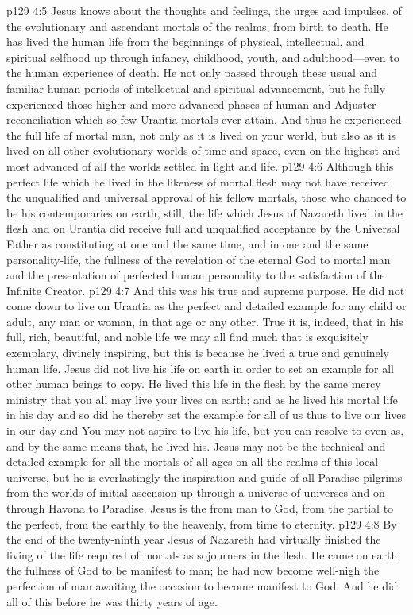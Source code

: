 \vs p129 4:5 Jesus knows about the thoughts and feelings, the urges and impulses, of the evolutionary and ascendant mortals of the realms, from birth to death. He has lived the human life from the beginnings of physical, intellectual, and spiritual selfhood up through infancy, childhood, youth, and adulthood---even to the human experience of death. He not only passed through these usual and familiar human periods of intellectual and spiritual advancement, but he  fully experienced those higher and more advanced phases of human and Adjuster reconciliation which so few Urantia mortals ever attain. And thus he experienced the full life of mortal man, not only as it is lived on your world, but also as it is lived on all other evolutionary worlds of time and space, even on the highest and most advanced of all the worlds settled in light and life.
\vs p129 4:6 Although this perfect life which he lived in the likeness of mortal flesh may not have received the unqualified and universal approval of his fellow mortals, those who chanced to be his contemporaries on earth, still, the life which Jesus of Nazareth lived in the flesh and on Urantia did receive full and unqualified acceptance by the Universal Father as constituting at one and the same time, and in one and the same personality\hyp{}life, the fullness of the revelation of the eternal God to mortal man and the presentation of perfected human personality to the satisfaction of the Infinite Creator.
\vs p129 4:7 And this was his true and supreme purpose. He did not come down to live on Urantia as the perfect and detailed example for any child or adult, any man or woman, in that age or any other. True it is, indeed, that in his full, rich, beautiful, and noble life we may all find much that is exquisitely exemplary, divinely inspiring, but this is because he lived a true and genuinely human life. Jesus did not live his life on earth in order to set an example for all other human beings to copy. He lived this life in the flesh by the same mercy ministry that you all may live your lives on earth; and as he lived his mortal life in his day and  so did he thereby set the example for all of us thus to live our lives in our day and  You may not aspire to live his life, but you can resolve to  even as, and by the same means that, he lived his. Jesus may not be the technical and detailed example for all the mortals of all ages on all the realms of this local universe, but he is everlastingly the inspiration and guide of all Paradise pilgrims from the worlds of initial ascension up through a universe of universes and on through Havona to Paradise. Jesus is the  from man to God, from the partial to the perfect, from the earthly to the heavenly, from time to eternity.\plusone
\pc \vs p129 4:8 By the end of the twenty\hyp{}ninth year Jesus of Nazareth had virtually finished the living of the life required of mortals as sojourners in the flesh. He came on earth the fullness of God to be manifest to man; he had now become well\hyp{}nigh the perfection of man awaiting the occasion to become manifest to God. And he did all of this before he was thirty years of age.
